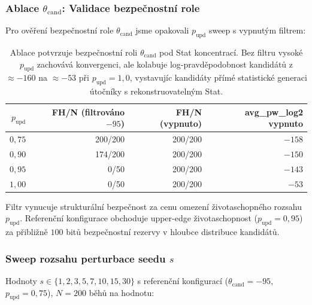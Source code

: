 \documentclass[11pt,a4paper]{article}
\begin{document}
\subsubsection{Ablace $\theta_\text{cand}$: Validace bezpečnostní role}\label{sec:empirical-pupd-ablation}

Pro ověření bezpečnostní role $\theta_\text{cand}$ jsme opakovali $p_\text{upd}$ sweep s vypnutým filtrem:

\begin{table}[ht]
\centering
\small
\begin{tabular}{rrrr}
\toprule
$p_\text{upd}$ & FH/N (filtrováno $-95$) & FH/N (vypnuto) & avg\_pw\_log2 vypnuto \\
\midrule
$0{,}75$ & 200/200 & 200/200 & $-158$ \\
$0{,}90$ & 174/200 & 200/200 & $-150$ \\
$0{,}95$ & 0/50 & 200/200 & $-143$ \\
$1{,}00$ & 0/50 & 200/200 & $-53$ \\
\bottomrule
\end{tabular}
\caption{Ablace potvrzuje bezpečnostní roli $\theta_\text{cand}$ pod Stat koncentrací. Bez filtru vysoké $p_\text{upd}$ zachovává konvergenci, ale kolabuje log-pravděpodobnost kandidátů z $\approx -160$ na $\approx -53$ při $p_\text{upd} = 1{,}0$, vystavujíc kandidáty přímé statistické generaci útočníky s rekonstruovatelným Stat.}
\label{tab:pupd-ablation}
\end{table}

Filtr vynucuje strukturální bezpečnost za cenu omezení životaschopného rozsahu $p_\text{upd}$. Referenční konfigurace obchoduje upper-edge životaschopnost ($p_\text{upd} = 0{,}95$) za přibližně $100$ bitů bezpečnostní rezervy v hloubce distribuce kandidátů.

\subsubsection{Sweep rozsahu perturbace seedu $s$}\label{sec:empirical-seed}

Hodnoty $s \in \{1, 2, 3, 5, 7, 10, 15, 30\}$ s referenční konfigurací ($\theta_\text{cand} = -95$, $p_\text{upd} = 0{,}75$), $N = 200$ běhů na hodnotu:
\end{document}
